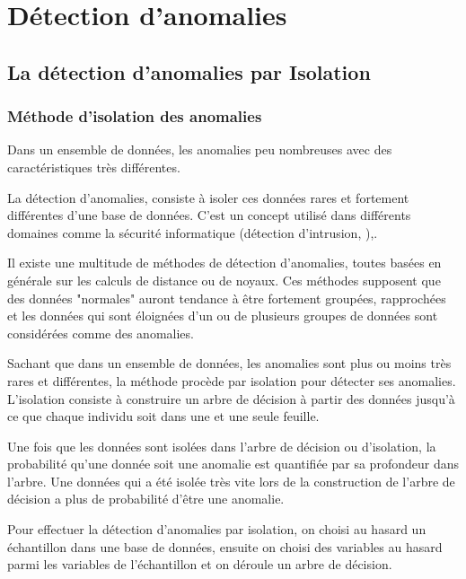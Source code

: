 \part{Détection d'anomalies}
\label{prt:detection}

\chapter{La détection d'anomalies par Isolation} 

\section{Méthode d'isolation des anomalies}

Dans un ensemble de données, les anomalies peu nombreuses avec des caractéristiques très différentes.

La détection d'anomalies, consiste à isoler ces données rares et fortement différentes d'une base de données. C'est un concept utilisé dans différents domaines comme la sécurité informatique (détection d'intrusion, ),.

Il existe une multitude de méthodes de détection d'anomalies, toutes basées en générale sur les calculs de distance ou de noyaux. Ces méthodes supposent que des données "normales" auront tendance à être fortement groupées, rapprochées et les données qui sont éloignées d'un ou de plusieurs groupes de données sont considérées comme des anomalies.

Sachant que dans un ensemble de données, les anomalies sont plus ou moins très rares et différentes, la méthode procède par isolation pour détecter ses anomalies. L'isolation consiste à construire un arbre de décision à partir des données jusqu'à ce que chaque individu soit dans une et une seule feuille.

Une fois que les données sont isolées dans l'arbre de décision ou d'isolation, la probabilité qu'une donnée soit une anomalie est quantifiée par sa profondeur dans l'arbre. Une données qui a été isolée très vite lors de la construction de l'arbre de décision a plus de probabilité d'être une anomalie.

Pour effectuer la détection d'anomalies par isolation, on choisi au hasard un échantillon dans une base de données, ensuite on choisi des variables au hasard parmi les variables de l'échantillon et on déroule un arbre de décision.


